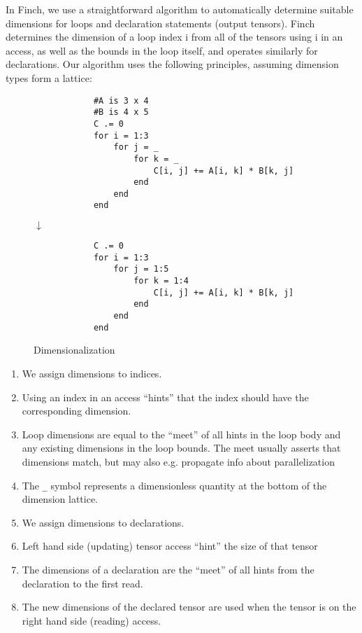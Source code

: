     
    In Finch, we use a straightforward algorithm to automatically determine suitable dimensions for loops and declaration statements (output tensors).
    Finch determines the dimension of a loop index i from all of the tensors using i in an access, as well as the bounds in the loop itself, and operates similarly for declarations.
    Our algorithm uses the following principles, assuming dimension types form a lattice:
    \begin{wrapfigure}{r}{0.3\textwidth}
        \begin{verbatim}
            #A is 3 x 4
            #B is 4 x 5
            C .= 0
            for i = 1:3
                for j = _
                    for k = _
                        C[i, j] += A[i, k] * B[k, j]
                    end
                end
            end
        \end{verbatim}
        $\downarrow$
        \begin{verbatim}
            C .= 0
            for i = 1:3
                for j = 1:5
                    for k = 1:4
                        C[i, j] += A[i, k] * B[k, j]
                    end
                end
            end
        \end{verbatim}
        \caption{Dimensionalization}\label{fig:dimensionalization}
    \end{wrapfigure}
    \begin{enumerate}
        \item We assign dimensions to indices.
        \item Using an index in an access “hints” that the index should have the corresponding dimension.
        \item Loop dimensions are equal to the “meet” of all hints in the loop body
        and any existing dimensions in the loop bounds. The meet usually asserts
        that dimensions match, but may also e.g. propagate info about parallelization
        \item The \texttt{_} symbol represents a dimensionless quantity at the bottom of the dimension lattice.
        \item We assign dimensions to declarations.
        \item Left hand side (updating) tensor access “hint” the size of that tensor
        \item The dimensions of a declaration are the “meet” of all hints from
        the declaration to the first read.
        \item The new dimensions of the declared tensor are used when the tensor is on the right hand side (reading)
        access.
    \end{enumerate}

